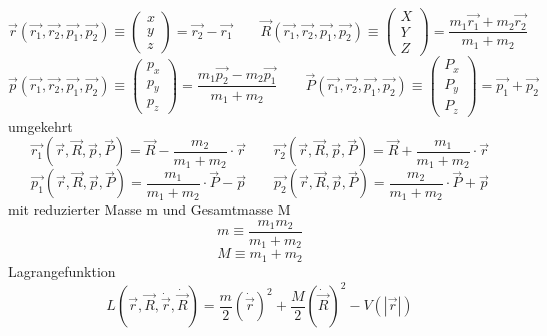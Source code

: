 \documentclass[11pt]{article} %
\begin{document}
\begin{equation} 
\vec{r}(\vec{r_1},\vec{r_2},\vec{p_1},\vec{p_2}) \equiv \begin{pmatrix} x \\ y \\ z \end{pmatrix} = \vec{r_2} - \vec{r_1} \quad \quad
\vec{R}(\vec{r_1},\vec{r_2},\vec{p_1},\vec{p_2}) \equiv \begin{pmatrix} X \\ Y \\ Z \end{pmatrix} = \frac {m_1\vec{r_1} + m_2\vec{r_2}} {m_1 + m_2} 
\end{equation}
\begin{equation} 
\vec{p}(\vec{r_1},\vec{r_2},\vec{p_1},\vec{p_2}) \equiv \begin{pmatrix} p_x \\ p_y \\ p_z \end{pmatrix} = \frac{ m_1\vec{p_2} - m_2\vec{p_1}}{m_1+m_2} \quad \quad
\vec{P}(\vec{r_1},\vec{r_2},\vec{p_1},\vec{p_2}) \equiv \begin{pmatrix} P_x \\ P_y \\ P_z \end{pmatrix} = \vec{p_1} + \vec{p_2} 
\end{equation}
umgekehrt
\begin{equation} 
\vec{r_1}(\vec{r},\vec{R},\vec{p},\vec{P}) = \vec{R} - \frac{m_2}{m_1 + m_2}\cdot \vec{r} \quad \quad
\vec{r_2}(\vec{r},\vec{R},\vec{p},\vec{P}) = \vec{R} + \frac{m_1}{m_1 + m_2} \cdot \vec{r} 
\end{equation}
\begin{equation} 
\vec{p_1}(\vec{r},\vec{R},\vec{p},\vec{P}) = \frac{m_1}{m_1 + m_2}\cdot \vec{P} - \vec{p} \quad \quad
\vec{p_2}(\vec{r},\vec{R},\vec{p},\vec{P}) = \frac{m_2}{m_1 + m_2}\cdot \vec{P} + \vec{p} 
\end{equation}
mit reduzierter Masse m und Gesamtmasse M
\begin{equation} m \equiv \frac{m_1 m_2}{m_1 + m_2} \end{equation}
\begin{equation} M \equiv m_1 + m_2 \end{equation}
Lagrangefunktion
\begin{equation}
L(\vec{r},\vec{R},\dot{\vec{r}},\dot{\vec{R}}) = 
\frac{m}{2}(\dot{\vec{r}})^2 +  \frac{M}{2}(\dot{\vec{R}})^2
- V(\left| \vec{r} \right|)
\end{equation}
\end{document}
